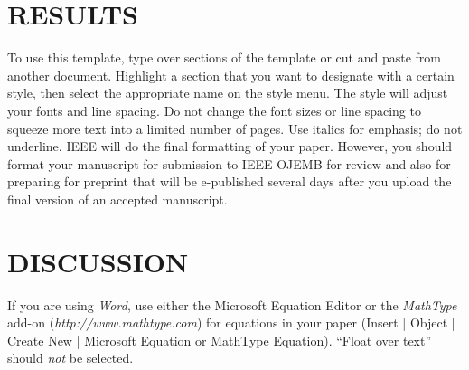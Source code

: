 \documentclass[journal]{IEEEtran}
\begin{document}



%
\IEEEpeerreviewmaketitle





\section{RESULTS}
To use this template, type over sections of the template or cut and paste from another document. Highlight a section that you want to designate with a certain style, then select the appropriate name on the style menu. The style will adjust your fonts and line spacing. Do not change the font sizes or line spacing to squeeze more text into a limited number of pages. Use italics for emphasis; do not underline.
IEEE will do the final formatting of your paper. However, you should format your manuscript for submission to IEEE OJEMB for review and also for preparing for preprint that will be e-published several days after you upload the final version of an accepted manuscript. 

\section{DISCUSSION}
If you are using \textit{Word}, use either the Microsoft Equation Editor or the \textit{MathType} add-on (\textit{http://www.mathtype.com}) for equations in your paper (Insert | Object | Create New | Microsoft Equation or MathType Equation). “Float over text” should \textit{not} be selected. 	
\end{document}
